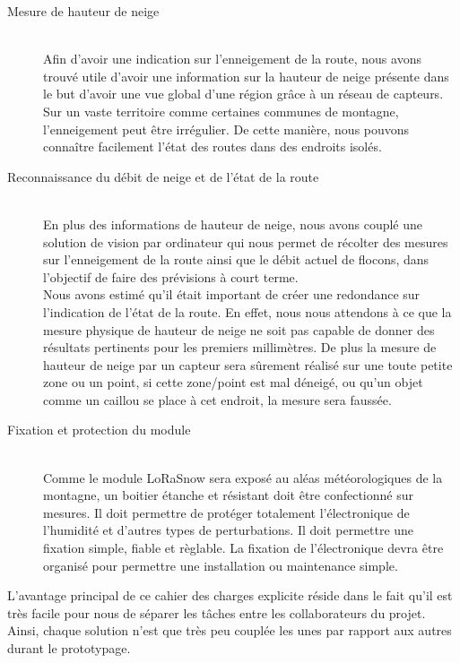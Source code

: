 \begin{description}
    \item[Mesure de hauteur de neige] \hfill \\ 
    Afin d'avoir une indication sur l'enneigement de la route, nous 
    avons trouvé utile d'avoir une information sur la hauteur de neige présente dans le but d'avoir 
    une vue global d'une région grâce à un réseau de capteurs. Sur un vaste territoire comme certaines
    communes de montagne, l'enneigement peut être irrégulier. De cette manière, nous pouvons connaître 
    facilement l'état des routes dans des endroits isolés.
    \item[Reconnaissance du débit de neige et de l'état de la route] \hfill \\
    En plus des informations de hauteur de neige, nous avons couplé une solution de vision par ordinateur
    qui nous permet de récolter des mesures sur l'enneigement de la route ainsi que le débit actuel de
    flocons, dans l'objectif de faire des prévisions à court terme.\\
    Nous avons estimé qu'il était important de créer une redondance sur l'indication de l'état de la
    route. En effet, nous nous attendons à ce que la mesure physique de hauteur de neige ne soit pas 
    capable de donner des résultats pertinents pour les premiers millimètres. De plus la mesure de
    hauteur de neige par un capteur sera sûrement réalisé sur une toute petite zone ou un point,
    si cette zone/point est mal déneigé, ou qu'un objet comme un caillou se place à cet endroit,
    la mesure sera faussée.
    \item[Fixation et protection du module] \hfill \\ 
    Comme le module LoRaSnow sera exposé au aléas météorologiques de la montagne, un boitier étanche 
    et résistant doit être confectionné sur mesures. Il doit permettre de protéger totalement l'électronique de 
    l'humidité et d'autres types de perturbations. Il doit permettre une fixation simple,
    fiable et règlable. La fixation de l'électronique devra être organisé pour permettre une
    installation ou maintenance simple.
\end{description}

L'avantage principal de ce cahier des charges explicite réside dans le fait qu'il est très facile pour
nous de séparer les tâches entre les collaborateurs du projet. Ainsi, chaque solution n'est que très 
peu couplée les unes par rapport aux autres durant le prototypage.
\newpage

